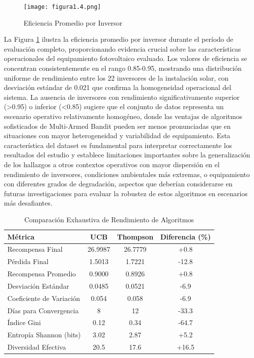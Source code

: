 \documentclass[conference]{IEEEtran}
\begin{document}
\begin{figure}[H]
\centering
\texttt{[image: figura1.4.png]}
\caption{Eficiencia Promedio por Inversor}
\label{fig:1.4}
\end{figure}

La Figura \ref{fig:1.4} ilustra la eficiencia promedio por inversor durante el período de evaluación completo, proporcionando evidencia crucial sobre las características operacionales del equipamiento fotovoltaico evaluado. Los valores de eficiencia se concentran consistentemente en el rango 0.85-0.95, mostrando una distribución uniforme de rendimiento entre los 22 inversores de la instalación solar, con desviación estándar de 0.021 que confirma la homogeneidad operacional del sistema. La ausencia de inversores con rendimiento significativamente superior (>0.95) o inferior (<0.85) sugiere que el conjunto de datos representa un escenario operativo relativamente homogéneo, donde las ventajas de algoritmos sofisticados de Multi-Armed Bandit pueden ser menos pronunciadas que en situaciones con mayor heterogeneidad y variabilidad de equipamiento. Esta característica del dataset es fundamental para interpretar correctamente los resultados del estudio y establece limitaciones importantes sobre la generalización de los hallazgos a otros contextos operativos con mayor dispersión en el rendimiento de inversores, condiciones ambientales más extremas, o equipamiento con diferentes grados de degradación, aspectos que deberían considerarse en futuras investigaciones para evaluar la robustez de estos algoritmos en escenarios más desafiantes.

\begin{table}[H]
\centering
\caption{Comparación Exhaustiva de Rendimiento de Algoritmos}
\label{tab:performance}
\begin{tabular}{lccc}
\toprule
\textbf{Métrica} & \textbf{UCB} & \textbf{Thompson} & \textbf{Diferencia (\%)} \\
\midrule
Recompensa Final & 26.9987 & 26.7779 & +0.8 \\
Pérdida Final & 1.5013 & 1.7221 & -12.8 \\
Recompensa Promedio & 0.9000 & 0.8926 & +0.8 \\
Desviación Estándar & 0.0485 & 0.0521 & -6.9 \\
Coeficiente de Variación & 0.054 & 0.058 & -6.9 \\
Días para Convergencia & 8 & 12 & -33.3 \\
Índice Gini & 0.12 & 0.34 & -64.7 \\
Entropía Shannon (bits) & 3.02 & 2.87 & +5.2 \\
Diversidad Efectiva & 20.5 & 17.6 & +16.5 \\
\bottomrule
\end{tabular}
\end{table}
\end{document}
